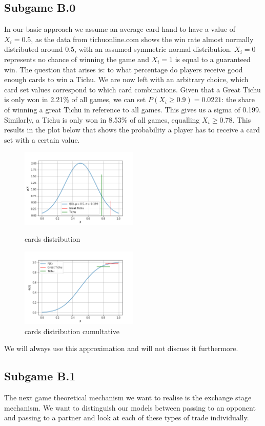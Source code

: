 \subsection{Subgame B.0}
In our basic approach we assume an average card hand to have a value of $X_i = 0.5$, as the data from tichuonline.com shows the win rate almost normally distributed around 0.5, with an assumed symmetric normal distribution. $X_i = 0$ represents no chance of winning the game and $X_i = 1$ is equal to a guaranteed win. The question that arises is: to what percentage do players receive good enough cards to win a Tichu. We are now left with an arbitrary choice, which card set values correspond to which card combinations. Given that a Great Tichu is only won in 2.21$\%$ of all games, we can set $P(X_i \geq 0.9) = 0.0221$: the share of winning a great Tichu in reference to all games. This gives us a sigma of 0.199. Similarly, a Tichu is only won in 8.53$\%$ of all games, equalling $X_i\geq 0.78$. This results in the plot below that shows the probability a player has to receive a card set with a certain value.

\begin{figure}[h]
    \centering
    \includegraphics[width=0.5\textwidth]{Bilder/cards_distribution}
    \caption{cards distribution}
    \label{fig:2}
    \centering
    \includegraphics[width=0.5\textwidth]{Bilder/cards_distribution_cumultative}
    \caption{cards distribution cumultative}
    \label{fig:3}
\end{figure}
We will always use this approximation and will not discuss it furthermore.

\subsection{Subgame B.1}
The next game theoretical mechanism we want to realise is the exchange stage mechanism. We want to distinguish our models between passing to an opponent and passing to a partner and look at each of these types of trade individually. 

